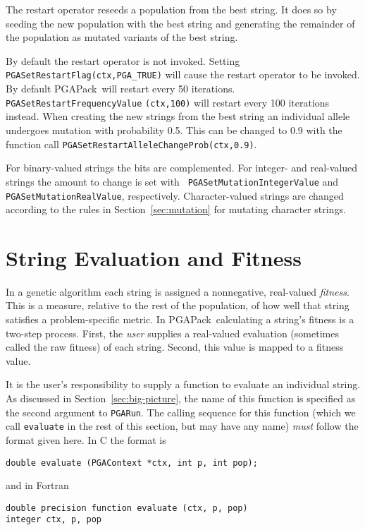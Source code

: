 \documentclass{report}
\newcommand{\pga}{PGAPack}
\begin{document}
The restart operator reseeds a population from the best string.  It does so by
seeding the new population with the best string and generating the remainder
of the population as mutated variants of the best string.

\begin{sloppypar}
By default the restart operator is not invoked.  Setting {\tt
PGASetRestartFlag(ctx,PGA\_TRUE)} will cause the restart operator to be
invoked.  By default \pga\ will restart every 50 iterations.  {\tt
PGASetRestartFrequencyValue} {\tt (ctx,100)} will restart every 100 iterations
instead.  When creating the new strings from the best string an individual
allele undergoes mutation with probability 0.5.  This can be changed to 0.9
with the function call {\tt PGASetRestartAlleleChangeProb(ctx,0.9)}.
\end{sloppypar}

For binary-valued strings the bits are complemented.  For integer- and
real-valued strings the amount to change is set with {\tt
PGASetMutationIntegerValue} and {\tt PGASetMutationRealValue}, respectively.
Character-valued strings are changed according to the rules in
Section~\ref{sec:mutation} for mutating character strings.

\section{String Evaluation and Fitness}\label{sec:evaluation}

In a genetic algorithm each string is assigned a nonnegative, real-valued {\em
fitness}.  This is a measure, relative to the rest of the population, of how
well that string satisfies a problem-specific metric.  In \pga\ calculating a
string's fitness is a two-step process.  First, the {\em user} supplies a
real-valued evaluation (sometimes called the raw fitness) of each string.
Second, this value is mapped to a fitness value.

It is the user's responsibility to supply a function to evaluate an individual
string.  As discussed in Section~\ref{sec:big-picture}, the name of this
function is specified as the second argument to {\tt PGARun}. The calling
sequence for this function (which we call {\tt evaluate} in the rest of this
section, but may have any name) {\em must} follow the format given here.  In C
the format is
\begin{verbatim}
double evaluate (PGAContext *ctx, int p, int pop);
\end{verbatim}
and in Fortran
\begin{verbatim}
double precision function evaluate (ctx, p, pop)
integer ctx, p, pop
\end{verbatim}
\end{document}
